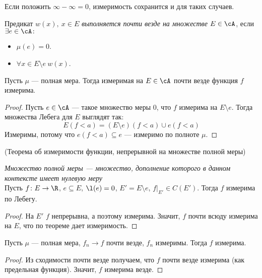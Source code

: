 \begin{remark}
	Если положить $\infty - \infty = 0$, измеримость сохранится и для таких 
	случаев.
\end{remark}

\begin{definition}
	Предикат $w(x),~ x \in E$ \textit{выполняется почти везде на множестве} $E \in \cA$, 
	если $\exists e \in \cA\colon~$
\begin{itemize}
	\item $\mu(e) = 0$.
	\item $\forall x \in E \setminus e~ w(x)$.
\end{itemize}
\end{definition}

\begin{theorem}
	Пусть $\mu$ --- полная мера. Тогда измеримая на $E \in \cA$ почти везде функция $f$
	измерима.
\end{theorem}
\begin{proof}
	Пусть $e \in \cA$ --- такое множество меры $0$, что $f$ измерима на $E \setminus e$.
	Тогда множества Лебега для $E$ выглядят так:
\[
	E(f < a) = (E \setminus e)(f < a) \cup e(f < a)
\]
	Измеримы, потому что $e(f < a) \subseteq e$ --- измеримо по полноте $\mu$.
\end{proof}

\begin{corollary}(Теорема об измеримости функции, непрерывной на множестве полной меры)

	\textit{Множество полной меры --- множество, дополнение которого в данном 
	контексте имеет нулевую меру} \\

	Пусть $f \colon E \to \R$, 
	$e \subseteq E$, $\l(e) = 0$, $E' = E \setminus e$,
	$f\big|_{E'} \in C(E')$. Тогда $f$ измерима по Лебегу.
\end{corollary}
\begin{proof}
	На $E'$ $f$ непрерывна, а поэтому измерима. Значит, $f$ почти всюду измерима на $E$,
	что по теореме дает измеримость.
\end{proof}

\begin{corollary}
	Пусть $\mu$ --- полная мера, $f_n \to f$ почти везде, $f_n$ измеримы. 
	Тогда $f$ измерима.
\end{corollary}
\begin{proof}
	Из сходимости почти везде получаем, что $f$ почти везде измерима (как предельная 
	функция). Значит, $f$ измерима везде.
\end{proof}


